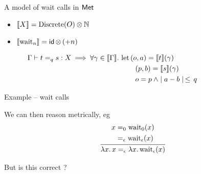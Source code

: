 \documentclass{beamer}
\begin{document}
\begin{frame}{A model of wait calls in $\mathsf{Met}$}
        \begin{itemize}
                \item
                        $\llbracket X \rrbracket = \text{Discrete}(O) \otimes \mathbb{N} $
                \item   $\llbracket \text{wait}_n \rrbracket = \operatorname{\mathsf{id}} \otimes\, (+n) $
        \end{itemize}

        \pause
        \begin{align*}
                \hspace{-2cm}
                \Gamma \vdash t =_q s : X 
                &
                \> \Longrightarrow \> 
                \forall \gamma \in \sem{\Gamma}. \
                \text{let} \,
                (o,a) = \sem{t}(\gamma)
                \\
                & 
                \hspace{3.15cm} (p,b) = \sem{s}(\gamma)
                \\
                & 
                \hspace{3.15cm} o = p \> \wedge  \mid a - b \mid \, \leq \, q
        \end{align*}
\end{frame}

\begin{frame}{Example -- wait calls}

        
        We can then reason metrically, eg
        \[
                \infer{
                        \lambda x. \, x =_\epsilon \lambda x. \, \text{wait}_\epsilon(x)
                }{
                        \begin{aligned}
                                x 
                                & =_0 \text{wait}_0(x) 
                                \\
                                & =_\epsilon \text{wait}_\epsilon(x)
                        \end{aligned}
                }
        \]

        \pause
        \bigskip
        But is this correct ?
\end{frame}
\end{document}
